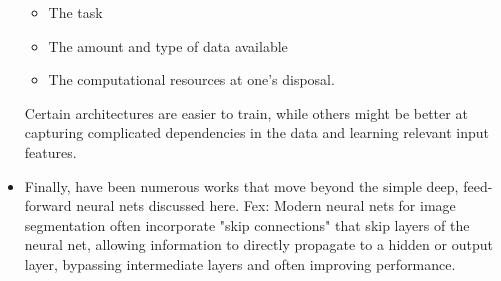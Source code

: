 \documentclass[norsk,a4paper,11pt]{article}
\begin{document}
\begin{itemize}
	\begin{itemize}
		\item The task
		\item The amount and type of data available
		\item The computational resources at one's disposal.
	\end{itemize}
	Certain architectures are easier to train, while others might be better at capturing complicated dependencies in the data and learning relevant input features.
	\item Finally, have been numerous works that move beyond the simple deep, feed-forward neural nets discussed here. Fex: Modern neural nets for image segmentation often incorporate "skip connections" that skip layers of the neural net, allowing information to directly propagate to a hidden or output layer, bypassing intermediate layers and often improving performance.
\end{itemize}
\end{document}

